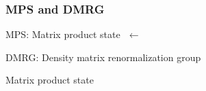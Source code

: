 \documentclass{beamer}
\theoremstyle{definition}
\begin{document}
\begin{frame}
	\frametitle{MPS and DMRG}
	MPS: Matrix product state $\,\,\leftarrow$ \\
	
	\vspace{8pt}
	
	DMRG: Density matrix renormalization group\\
	
	
	\vspace{12pt}
	
	Matrix product state 
	
\end{frame}
\end{document}
